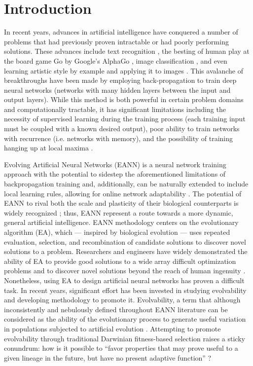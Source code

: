 \section{Introduction}
In recent years, advances in artificial intelligence have conquered a number of problems that had previously proven intractable or had poorly performing solutions. These advances include text recognition \cite{GuRecentNetworks}, the besting of human play at the board game Go by Google's AlphaGo \cite{Silver2016MasteringSearch}, image classification \cite{GuRecentNetworks}, and even learning artistic style by example and applying it to images \cite{Gatys2015AStyle}. This avalanche of breakthroughs have been made by employing back-propagation to train deep neural networks (networks with many hidden layers between the input and output layers). While this method is both powerful in certain problem domains and computationally tractable, it has significant limitations including the necessity of supervised learning during the training process (each training input must be coupled with a known desired output), poor ability to train networks with recurrence (i.e. networks with memory), and the possibility of training hanging up at local maxima \cite[pg 312, 364]{Downing2015IntelligenceSystems}. 

Evolving Artificial Neural Networks (EANN) is a neural network training approach with the potential to sidestep the aforementioned limitations of backpropagation training and, additionally, can be naturally extended to include local learning rules, allowing for online network adaptability \cite{Tonelli2013OnNetworks}. The potential of EANN to rival both the scale and plasticity of their biological counterparts is widely recognized \cite{Tonelli2013OnNetworks}; thus, EANN represent a route towards a more dynamic, general artificial intelligence. EANN methodology centers on the evolutionary algorithm (EA), which --- inspired by biological evolution --- uses repeated evaluation, selection, and recombination of candidate solutions to discover novel solutions to a problem. Researchers and engineers have widely demonstrated the ability of EA to provide good solutions to a wide array difficult optimization problems and to discover novel solutions beyond the reach of human ingenuity \cite{Poli2008AProgramming}. Nonetheless, using EA to design artificial neural networks has proven a difficult task. In recent years, significant effort has been invested in studying evolvability and developing methodology to promote it. Evolvability, a term that although inconsistently and nebulously defined throughout EANN literature \cite{Richter2015EvolvabilitySurvey} can be considered as the ability of the evolutionary process to generate useful variation in populations subjected to artificial evolution \cite{Richter2015EvolvabilitySurvey,Reisinger2005TowardsEvolvability, Wilder2015ReconcilingEvolvability}. Attempting to promote evolvability through traditional Darwinian fitness-based selection raises a sticky conundrum: how is it possible to ``favor properties that may prove useful to a given lineage in the future, but have no present adaptive function'' \cite{Pigliucci2008IsEvolvable}? 

